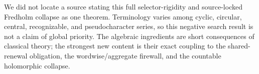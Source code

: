 We did not locate a source stating this full selector-rigidity and
source-locked Fredholm collapse as one theorem.  Terminology varies among
cyclic, circular, central, recognizable, and pseudocharacter series, so this
negative search result is not a claim of global priority.  The algebraic
ingredients are short consequences of classical theory; the strongest new
content is their exact coupling to the shared-renewal obligation, the
wordwise/aggregate firewall, and the countable holomorphic collapse.

